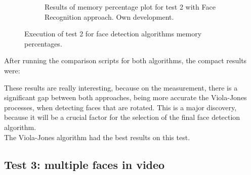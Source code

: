 \documentclass[11pt]{report} %
\begin{document}
\begin{figure}[H]
\begin{subfigure}{.5\textwidth}
		\caption{Results of memory percentage plot for test 2 with Face Recognition approach. Own development.}
		\label{fig_computer_vision_test_2_memory_b}
	\end{subfigure}%
	\caption{Execution of test 2 for face detection algorithms memory percentages.}
	\label{fig_computer_vision_test_2_memory}
\end{figure}


After running the comparison scripts for both algorithms, the compact results were:

\begin{table}[H]
\begin{center}
\caption{\label{tab:results_of_test_1_for_face_detection} Results of test 1 for face detection algorithms. Own development.}
\end{center}
\end{table}

These results are really interesting, because on the  measurement, there is a significant gap between both approaches, being more accurate the Viola-Jones processes, when detecting faces that are rotated. This is a major discovery, because it will be a crucial factor for the selection of the final face detection algorithm.\\

The Viola-Jones algorithm had the best results on this test.\\


\subsection{Test 3: multiple faces in video}
\label{sec:test_3_multiple_faces_in_video}
\end{document}
